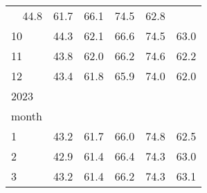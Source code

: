 \begin{tabular}{llllll}
  \multicolumn{1}{|r}{44.8} &
  \multicolumn{1}{r}{61.7} &
  \multicolumn{1}{r}{66.1} &
  \multicolumn{1}{r}{74.5} &
  \multicolumn{1}{r}{62.8} \\
\multicolumn{1}{l}{\hspace{3em}10} &
  \multicolumn{1}{|r}{44.3} &
  \multicolumn{1}{r}{62.1} &
  \multicolumn{1}{r}{66.6} &
  \multicolumn{1}{r}{74.5} &
  \multicolumn{1}{r}{63.0} \\
\multicolumn{1}{l}{\hspace{3em}11} &
  \multicolumn{1}{|r}{43.8} &
  \multicolumn{1}{r}{62.0} &
  \multicolumn{1}{r}{66.2} &
  \multicolumn{1}{r}{74.6} &
  \multicolumn{1}{r}{62.2} \\
\multicolumn{1}{l}{\hspace{3em}12} &
  \multicolumn{1}{|r}{43.4} &
  \multicolumn{1}{r}{61.8} &
  \multicolumn{1}{r}{65.9} &
  \multicolumn{1}{r}{74.0} &
  \multicolumn{1}{r}{62.0} \\
\multicolumn{1}{l}{\hspace{1em}2023} &
  \multicolumn{1}{|r}{} &
  \multicolumn{1}{r}{} &
  \multicolumn{1}{r}{} &
  \multicolumn{1}{r}{} &
  \multicolumn{1}{r}{} \\
\multicolumn{1}{l}{\hspace{2em}month} &
  \multicolumn{1}{|r}{} &
  \multicolumn{1}{r}{} &
  \multicolumn{1}{r}{} &
  \multicolumn{1}{r}{} &
  \multicolumn{1}{r}{} \\
\multicolumn{1}{l}{\hspace{3em}1} &
  \multicolumn{1}{|r}{43.2} &
  \multicolumn{1}{r}{61.7} &
  \multicolumn{1}{r}{66.0} &
  \multicolumn{1}{r}{74.8} &
  \multicolumn{1}{r}{62.5} \\
\multicolumn{1}{l}{\hspace{3em}2} &
  \multicolumn{1}{|r}{42.9} &
  \multicolumn{1}{r}{61.4} &
  \multicolumn{1}{r}{66.4} &
  \multicolumn{1}{r}{74.3} &
  \multicolumn{1}{r}{63.0} \\
\multicolumn{1}{l}{\hspace{3em}3} &
  \multicolumn{1}{|r}{43.2} &
  \multicolumn{1}{r}{61.4} &
  \multicolumn{1}{r}{66.2} &
  \multicolumn{1}{r}{74.3} &
  \multicolumn{1}{r}{63.1} \\
\cline{1-6}
\end{tabular}
